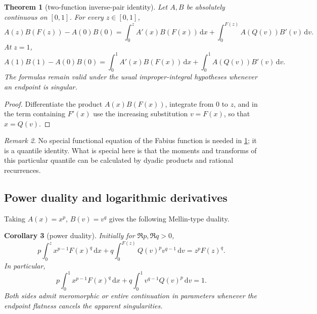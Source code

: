\documentclass[11pt,oneside]{article}
\newtheorem{theorem}{Theorem}[section]
\newtheorem{corollary}[theorem]{Corollary}
\theoremstyle{definition}
\theoremstyle{remark}
\newtheorem{remark}[theorem]{Remark}
\newcommand{\F}{F}
\newcommand{\Q}{Q}
\newcommand{\dd}{\,\mathrm d}
\newcommand{\1}{\mathbf 1}
\begin{document}
\begin{theorem}[two-function inverse-pair identity]\label{p4:thm:AB}
Let \(A,B\) be absolutely continuous on \([0,1]\).  For every \(z\in[0,1]\),
\begin{equation}\label{p4:eq:AB-incomplete}
 A(z)B(\F(z))-A(0)B(0)
 =\int_0^z A'(x)B(\F(x))\dd x
 +\int_0^{\F(z)}A(\Q(v))B'(v)\dd v.
\end{equation}
At \(z=1\),
\begin{equation}\label{p4:eq:AB-complete}
 A(1)B(1)-A(0)B(0)
 =\int_0^1A'(x)B(\F(x))\dd x
 +\int_0^1A(\Q(v))B'(v)\dd v.
\end{equation}
The formulas remain valid under the usual improper-integral hypotheses whenever an
endpoint is singular.
\end{theorem}

\begin{proof}
Differentiate the product \(A(x)B(\F(x))\), integrate from \(0\) to \(z\), and in
the term containing \(\F'(x)\) use the increasing substitution \(v=\F(x)\),
so that \(x=\Q(v)\).
\end{proof}

\begin{remark}
No special functional equation of the Fabius function is needed in
\cref{p4:thm:AB}; it is a quantile identity.  What is special here is that the moments and
transforms of this particular quantile can be calculated by dyadic products and rational
recurrences.
\end{remark}

\subsection{Power duality and logarithmic derivatives}

Taking \(A(x)=x^p\), \(B(v)=v^q\) gives the following Mellin-type duality.

\begin{corollary}[power duality]\label{p4:cor:power-duality}
Initially for \(\Re p,\Re q>0\),
\begin{equation}\label{p4:eq:power-incomplete}
 p\int_0^z x^{p-1}\F(x)^q\dd x
 +q\int_0^{\F(z)}\Q(v)^p v^{q-1}\dd v
 =z^p\F(z)^q.
\end{equation}
In particular,
\begin{equation}\label{p4:eq:power-complete}
 p\int_0^1x^{p-1}\F(x)^q\dd x
 +q\int_0^1v^{q-1}\Q(v)^p\dd v=1.
\end{equation}
Both sides admit meromorphic or entire continuation in parameters whenever the endpoint
flatness cancels the apparent singularities.
\end{corollary}
\end{document}
